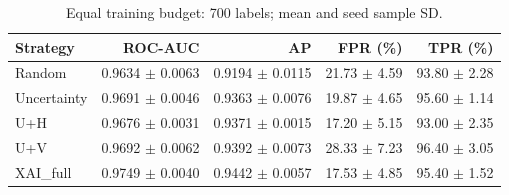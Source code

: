 \begin{table}[htbp]
\centering
\small
\caption{Equal training budget: 700 labels; mean and seed sample SD.}
\begin{tabular}{lrrrr}
\toprule
Strategy & ROC-AUC & AP & FPR (\%) & TPR (\%) \\
\midrule
Random & 0.9634 $\pm$ 0.0063 & 0.9194 $\pm$ 0.0115 & 21.73 $\pm$ 4.59 & 93.80 $\pm$ 2.28 \\
Uncertainty & 0.9691 $\pm$ 0.0046 & 0.9363 $\pm$ 0.0076 & 19.87 $\pm$ 4.65 & 95.60 $\pm$ 1.14 \\
U+H & 0.9676 $\pm$ 0.0031 & 0.9371 $\pm$ 0.0015 & 17.20 $\pm$ 5.15 & 93.00 $\pm$ 2.35 \\
U+V & 0.9692 $\pm$ 0.0062 & 0.9392 $\pm$ 0.0073 & 28.33 $\pm$ 7.23 & 96.40 $\pm$ 3.05 \\
XAI\_full & 0.9749 $\pm$ 0.0040 & 0.9442 $\pm$ 0.0057 & 17.53 $\pm$ 4.85 & 95.40 $\pm$ 1.52 \\
\bottomrule
\end{tabular}
\end{table}

